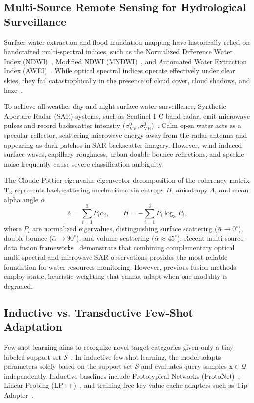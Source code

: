 \subsection{Multi-Source Remote Sensing for Hydrological Surveillance}
Surface water extraction and flood inundation mapping have historically relied on handcrafted multi-spectral indices, such as the Normalized Difference Water Index (NDWI)~\cite{mcfreeters1996use}, Modified NDWI (MNDWI)~\cite{xu2006modification}, and Automated Water Extraction Index (AWEI)~\cite{pekel2016high}. While optical spectral indices operate effectively under clear skies, they fail catastrophically in the presence of cloud cover, cloud shadows, and haze~\cite{rahimzadegan2021surface}.

To achieve all-weather day-and-night surface water surveillance, Synthetic Aperture Radar (SAR) systems, such as Sentinel-1 C-band radar, emit microwave pulses and record backscatter intensity ($\sigma^0_{\text{VV}}, \sigma^0_{\text{VH}}$)~\cite{clement2018multi,boudjit2021sen12flood}. Calm open water acts as a specular reflector, scattering microwave energy away from the radar antenna and appearing as dark patches in SAR backscatter imagery. However, wind-induced surface waves, capillary roughness, urban double-bounce reflections, and speckle noise frequently cause severe classification ambiguity. 

The Cloude-Pottier eigenvalue-eigenvector decomposition of the coherency matrix $\mathbf{T}_3$ represents backscattering mechanisms via entropy $H$, anisotropy $A$, and mean alpha angle $\bar{\alpha}$:
\begin{equation}
    \bar{\alpha} = \sum_{i=1}^3 P_i \alpha_i, \qquad H = -\sum_{i=1}^3 P_i \log_3 P_i,
\end{equation}
where $P_i$ are normalized eigenvalues, distinguishing surface scattering ($\bar{\alpha} \to 0^\circ$), double bounce ($\bar{\alpha} \to 90^\circ$), and volume scattering ($\bar{\alpha} \approx 45^\circ$). Recent multi-source data fusion frameworks~\cite{hong2021spectralformer,plaza2009recent} demonstrate that combining complementary optical multi-spectral and microwave SAR observations provides the most reliable foundation for water resources monitoring. However, previous fusion methods employ static, heuristic weighting that cannot adapt when one modality is degraded.

\subsection{Inductive vs. Transductive Few-Shot Adaptation}
Few-shot learning aims to recognize novel target categories given only a tiny labeled support set $\mathcal{S}$~\cite{snell2017prototypical,vinyals2016matching,sung2018learning,tian2020rethinking}. In inductive few-shot learning, the model adapts parameters solely based on the support set $\mathcal{S}$ and evaluates query samples $\bm{x} \in \mathcal{Q}$ independently. Inductive baselines include Prototypical Networks (ProtoNet)~\cite{snell2017prototypical}, Linear Probing (LP++)~\cite{huang2024lpplusplus}, and training-free key-value cache adapters such as Tip-Adapter~\cite{zhang2022tipadapter}.

